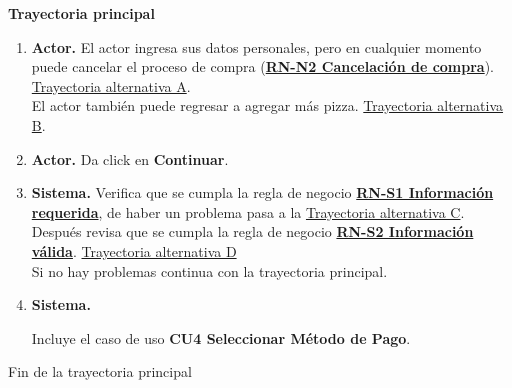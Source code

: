 \noindent \textbf{Trayectoria principal}

\begin{enumerate}
	\item {\textbf{Actor.}} El actor ingresa sus datos personales, pero en cualquier momento puede cancelar el proceso de compra (\hyperlink{RN:N2:Cancelacion}\textbf{{RN-N2 Cancelación de compra}}). \hyperlink{CU3:TAA}{Trayectoria alternativa A}.
	\\ El actor también puede regresar a agregar más pizza. \hyperlink{CU3:TAA}{Trayectoria alternativa B}.
	\\
	
	\item {\textbf{Actor.}} Da click en \textbf{Continuar}.
	
	\item \textbf{Sistema.} Verifica que se cumpla la regla de negocio \hyperlink{RN:S1:InfoRequerida}{\textbf{RN-S1 Información requerida}}, de haber un problema pasa a la \hyperlink{CU3:TAC}{Trayectoria alternativa C}.
	\\Después revisa que se cumpla la regla de negocio \hyperlink{RN:S2:InfoRequerida}{\textbf{RN-S2 Información válida}}. \hyperlink{CU3:TAD}{Trayectoria alternativa D}
	\\Si no hay problemas continua con la trayectoria principal.
	
	\item \hypertarget{CU3:TP:P4}{\textbf{Sistema.}} Incluye el caso de uso \textbf{CU4 Seleccionar Método de Pago}.
	
	
\end{enumerate}	
Fin de la trayectoria principal
\\

